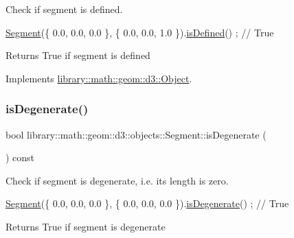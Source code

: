 Check if segment is defined. 


\begin{DoxyCode}
\hyperlink{classlibrary_1_1math_1_1geom_1_1d3_1_1objects_1_1_segment_a5562342d1edf2f52e37ce1bc138ee7d7}{Segment}(\{ 0.0, 0.0, 0.0 \}, \{ 0.0, 0.0, 1.0 \}).\hyperlink{classlibrary_1_1math_1_1geom_1_1d3_1_1objects_1_1_segment_a70a29c3822e4859a2e8cd4a52e1b26f5}{isDefined}() ; \textcolor{comment}{// True}
\end{DoxyCode}


\begin{DoxyReturn}{Returns}
True if segment is defined 
\end{DoxyReturn}


Implements \hyperlink{classlibrary_1_1math_1_1geom_1_1d3_1_1_object_a2216442e322f0c3ca5f01a4efa22baf7}{library\+::math\+::geom\+::d3\+::\+Object}.

\mbox{\label{classlibrary_1_1math_1_1geom_1_1d3_1_1objects_1_1_segment_a11324bd27db3ef9d931fdee763246759}} 
\subsubsection{\texorpdfstring{is\+Degenerate()}{isDegenerate()}}
{\footnotesize\ttfamily bool library\+::math\+::geom\+::d3\+::objects\+::\+Segment\+::is\+Degenerate (\begin{DoxyParamCaption}{ }\end{DoxyParamCaption}) const}



Check if segment is degenerate, i.\+e. its length is zero. 


\begin{DoxyCode}
\hyperlink{classlibrary_1_1math_1_1geom_1_1d3_1_1objects_1_1_segment_a5562342d1edf2f52e37ce1bc138ee7d7}{Segment}(\{ 0.0, 0.0, 0.0 \}, \{ 0.0, 0.0, 0.0 \}).\hyperlink{classlibrary_1_1math_1_1geom_1_1d3_1_1objects_1_1_segment_a11324bd27db3ef9d931fdee763246759}{isDegenerate}() ; \textcolor{comment}{// True}
\end{DoxyCode}


\begin{DoxyReturn}{Returns}
True if segment is degenerate 
\end{DoxyReturn}
\mbox{\label{classlibrary_1_1math_1_1geom_1_1d3_1_1objects_1_1_segment_ad408a3c17a4048183c4b646ec6cf91e9}} 
